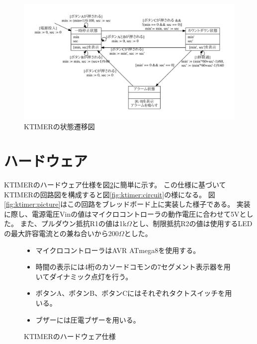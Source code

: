 \begin{figure}[h]
 \begin{center}
  \includegraphics[width=155mm]{figure/ktimer_state.pdf}
 \end{center}
 \caption{KTIMERの状態遷移図}
 \label{fig:ktimer:state}
\end{figure}

\clearpage
\section{ハードウェア}
KTIMERのハードウェア仕様を図\ref{fig:ktimer:hardware}に簡単に示す。
この仕様に基づいてKTIMERの回路図を構成すると図\ref{fig:ktimer:circuit}の様になる。
図\ref{fig:ktimer:picture}はこの回路をブレッドボード上に実装した様子である。
実装に際し、電源電圧Vinの値はマイクロコントローラの動作電圧に合わせて5Vとした。
また、プルダウン抵抗R1の値は1k$\Omega$とし、制限抵抗R2の値は使用するLEDの最大許容電流との兼ね合いから200$\Omega$とした。

\begin{figure}[h]
\begin{screen}
\begin{itemize}
  \item マイクロコントローラはAVR ATmega8を使用する。
  \item 時間の表示には4桁のカソードコモンの7セグメント表示器を用いてダイナミック点灯を行う。
  \item ボタンA、ボタンB、ボタンCにはそれぞれタクトスイッチを用いる。
  \item ブザーには圧電ブザーを用いる。
\end{itemize}
\end{screen}
\caption{KTIMERのハードウェア仕様}
\label{fig:ktimer:hardware}
\end{figure}

